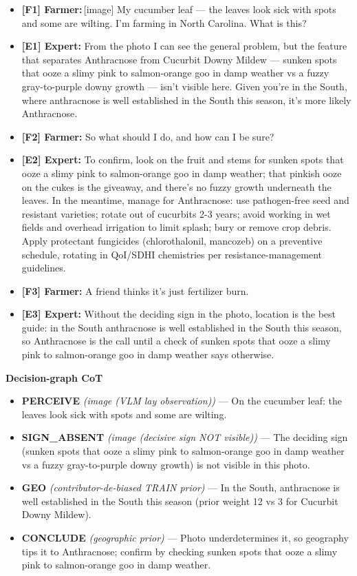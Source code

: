 \documentclass[11pt]{article}
\begin{document}
\begin{itemize}[leftmargin=1.1em,itemsep=2pt,label={}]
\item \textbf{[F1] Farmer:}\,\textcolor{grn}{[image]} My cucumber leaf --- the leaves look sick with spots and some are wilting. I'm farming in North Carolina. What is this?
\item \textbf{[E1] Expert:} From the photo I can see the general problem, but the feature that separates Anthracnose from Cucurbit Downy Mildew --- sunken spots that ooze a slimy pink to salmon-orange goo in damp weather vs a fuzzy gray-to-purple downy growth --- isn't visible here. Given you're in the South, where anthracnose is well established in the South this season, it's more likely Anthracnose.
\item \textbf{[F2] Farmer:} So what should I do, and how can I be sure?
\item \textbf{[E2] Expert:} To confirm, look on the fruit and stems for sunken spots that ooze a slimy pink to salmon-orange goo in damp weather; that pinkish ooze on the cukes is the giveaway, and there's no fuzzy growth underneath the leaves. In the meantime, manage for Anthracnose: use pathogen-free seed and resistant varieties; rotate out of cucurbits 2-3 years; avoid working in wet fields and overhead irrigation to limit splash; bury or remove crop debris. Apply protectant fungicides (chlorothalonil, mancozeb) on a preventive schedule, rotating in QoI/SDHI chemistries per resistance-management guidelines.
\item \textbf{[F3] Farmer:} A friend thinks it's just fertilizer burn.
\item \textbf{[E3] Expert:} Without the deciding sign in the photo, location is the best guide: in the South anthracnose is well established in the South this season, so Anthracnose is the call until a check of sunken spots that ooze a slimy pink to salmon-orange goo in damp weather says otherwise.
\end{itemize}
\textbf{Decision-graph CoT}
\begin{itemize}[leftmargin=1.1em,itemsep=1pt]
\item \textbf{PERCEIVE} {\footnotesize\textit{(image (VLM lay observation))}} --- On the cucumber leaf: the leaves look sick with spots and some are wilting.
\item \textbf{SIGN\_ABSENT} {\footnotesize\textit{(image (decisive sign NOT visible))}} --- The deciding sign (sunken spots that ooze a slimy pink to salmon-orange goo in damp weather vs a fuzzy gray-to-purple downy growth) is not visible in this photo.
\item \textbf{GEO} {\footnotesize\textit{(contributor-de-biased TRAIN prior)}} --- In the South, anthracnose is well established in the South this season (prior weight 12 vs 3 for Cucurbit Downy Mildew).
\item \textbf{CONCLUDE} {\footnotesize\textit{(geographic prior)}} --- Photo underdetermines it, so geography tips it to Anthracnose; confirm by checking sunken spots that ooze a slimy pink to salmon-orange goo in damp weather.
\end{itemize}
\end{document}
